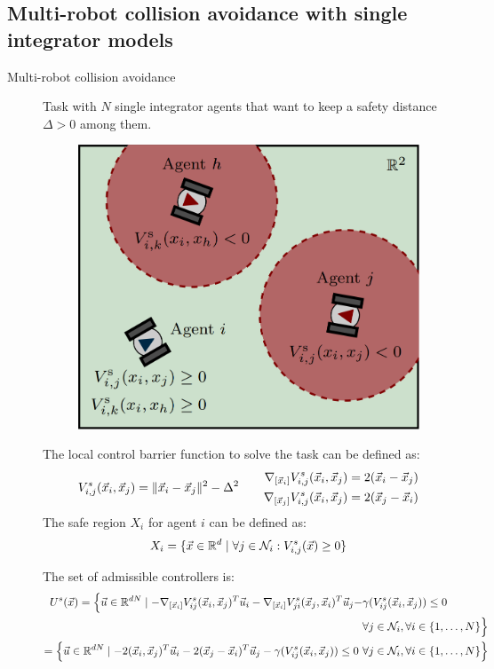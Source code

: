 \subsection{Multi-robot collision avoidance with single integrator models}


\begin{description}
    \item[Multi-robot collision avoidance] 
        Task with $N$ single integrator agents that want to keep a safety distance $\Delta > 0$ among them.

        \begin{figure}[H]
            \centering
            \includegraphics[width=0.35\linewidth]{./img/safety_control_multi.png}
        \end{figure}

        The local control barrier function to solve the task can be defined as:
        \[
            V^s_{i,j}({\vec{x}}_i, {\vec{x}}_j) = \Vert {\vec{x}}_i - {\vec{x}}_j \Vert^2 - \Delta^2
            \qquad
            \begin{aligned}
                \nabla_{[{\vec{x}}_i]} V_{i,j}^s({\vec{x}}_i, {\vec{x}}_j) &= 2({\vec{x}}_i - {\vec{x}}_j) \\
                \nabla_{[{\vec{x}}_j]} V_{i,j}^s({\vec{x}}_i, {\vec{x}}_j) &= 2({\vec{x}}_j - {\vec{x}}_i)
            \end{aligned}
        \]
        The safe region $X_i$ for agent $i$ can be defined as:
        \[
            X_i = \{ {\vec{x}} \in \mathbb{R}^d \mid \forall j \in \mathcal{N}_i: V_{i,j}^s({\vec{x}}) \geq 0 \}
        \]

        The set of admissible controllers is:
        \[
            \begin{aligned}
                \begin{aligned}
                    U^s({\vec{x}}) = \Big\{ {\vec{u}} \in \mathbb{R}^{dN} \mid 
                    -\nabla_{[{\vec{x}}_i]} V_{ij}^s({\vec{x}}_i, {\vec{x}}_j)^T {\vec{u}}_i 
                    - \nabla_{[{\vec{x}}_i]} V_{ji}^s({\vec{x}}_j, {\vec{x}}_i)^T {\vec{u}}_j 
                    - &\gamma(V_{ij}^{s}({\vec{x}}_i, {\vec{x}}_j)) \leq 0 \\
                    &\forall j \in \mathcal{N}_i, \forall i \in \{1, \dots, N\} \Big\}
                \end{aligned} \\
                = \Big\{ {\vec{u}} \in \mathbb{R}^{dN} \mid -2({\vec{x}}_i, {\vec{x}}_j)^T {\vec{u}}_i - 2({\vec{x}}_j-{\vec{x}}_i)^T {\vec{u}}_j - \gamma(V_{ij}^s({\vec{x}}_i, {\vec{x}}_j)) \leq 0 \,\,\forall j \in \mathcal{N}_i, \forall i \in \{1, \dots, N\} \Big\}
            \end{aligned}
        \]

\end{description}


